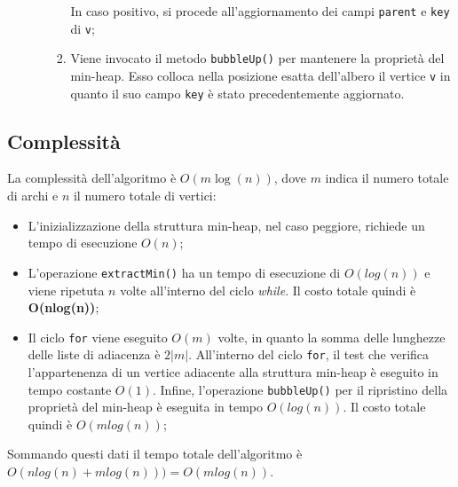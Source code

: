 \begin{itemize}
\begin{enumerate}
\begin{enumerate}
			In caso positivo, si procede all'aggiornamento dei campi \texttt{parent} e \texttt{key} di \texttt{v};
			\item Viene invocato il metodo \texttt{bubbleUp()} per mantenere la proprietà del min-heap. 
			Esso colloca nella posizione esatta dell'albero il vertice \texttt{v} in quanto il suo campo \texttt{key} è stato precedentemente aggiornato.
		\end{enumerate} 
	\end{enumerate}
\end{itemize}

\subsection{Complessità}
	La complessità dell'algoritmo è $O(m\log(n))$, dove $m$ indica il numero totale di archi e $n$ il numero totale di vertici:
	\begin{itemize}
		\item L'inizializzazione della struttura min-heap, nel caso peggiore, richiede un tempo di esecuzione $O(n)$;
		\item L'operazione \texttt{extractMin()} ha un tempo di esecuzione di $O(log(n))$ e viene ripetuta $n$ volte all'interno del ciclo \emph{while}. Il costo totale quindi è \textbf{O(nlog(n))};
		\item Il ciclo \texttt{for} viene eseguito $O(m)$ volte, in quanto la somma delle lunghezze delle liste di adiacenza è $2|m|$. All'interno del ciclo \texttt{for}, il test che verifica l'appartenenza di un vertice adiacente alla struttura min-heap è eseguito in tempo costante $O(1)$. 
		Infine, l'operazione \texttt{bubbleUp()} per il ripristino della proprietà del min-heap è eseguita in tempo $O(log(n))$. 
		Il costo totale quindi è $O(mlog(n))$;
	\end{itemize}
	Sommando questi dati il tempo totale dell'algoritmo è $O(nlog(n) + mlog(n))) = O(mlog(n))$.
	
\pagebreak
